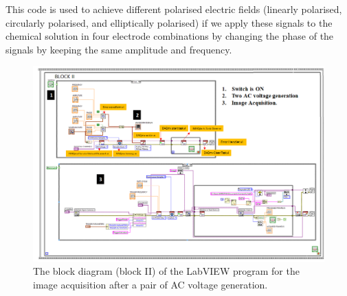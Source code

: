 \documentclass[journal=jacsat,manuscript=article]{achemso}
\begin{document}

This code is used to achieve different polarised electric fields (linearly polarised,
circularly polarised, and elliptically polarised) if we apply these signals to the chemical solution in four electrode combinations by changing the phase of the signals by keeping the same amplitude and frequency.
\begin{figure}[H]
	\centering
	\includegraphics[width=\linewidth, angle=90]{polarised_block_2.png}
	\caption{The block diagram (block II) of the LabVIEW program for the image acquisition after a pair of AC voltage generation.}
	\label{fig:ex9}
\end{figure}
\end{document}

